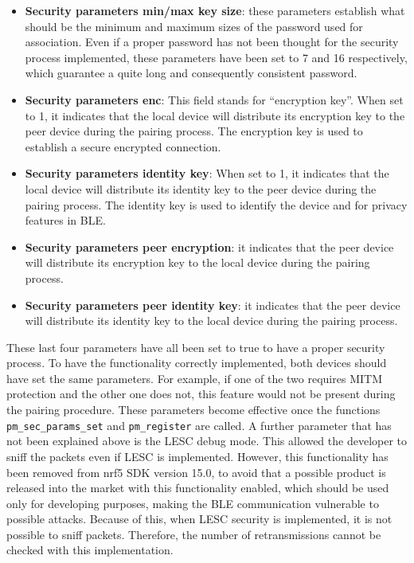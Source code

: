 \documentclass{Configuration_Files/PoliMi3i_thesis}
\begin{document}
\begin{itemize}
    \item \textbf{Security parameters min/max key size}: these parameters establish what should be the minimum and maximum sizes of the password used for association. Even if a proper password has not been thought for the security process implemented, these parameters have been set to 7 and 16 respectively, which guarantee a quite long and consequently consistent password.
    \item \textbf{Security parameters enc}: This field stands for ``encryption key''. When set to 1, it indicates that the local device will distribute its encryption key to the peer device during the pairing process. The encryption key is used to establish a secure encrypted connection.
    \item \textbf{Security parameters identity key}: When set to 1, it indicates that the local device will distribute its identity key to the peer device during the pairing process. The identity key is used to identify the device and for privacy features in BLE.
    \item \textbf{Security parameters peer encryption}: it indicates that the peer device will distribute its encryption key to the local device during the pairing process.
    \item \textbf{Security parameters peer identity key}: it indicates that the peer device will distribute its identity key to the local device during the pairing process.
\end{itemize}

These last four parameters have all been set to true to have a proper security process. To have the functionality correctly implemented, both devices should have set the same parameters. For example, if one of the two requires MITM protection and the other one does not, this feature would not be present during the pairing procedure. These parameters become effective once the functions \texttt{pm\_sec\_params\_set} and \texttt{pm\_register} are called. A further parameter that has not been explained above is the LESC debug mode. This allowed the developer to sniff the packets even if LESC is implemented. However, this functionality has been removed from nrf5 SDK version 15.0, to avoid that a possible product is released into the market with this functionality enabled, which should be used only for developing purposes, making the BLE communication vulnerable to possible attacks. Because of this, when LESC security is implemented, it is not possible to sniff packets. Therefore, the number of retransmissions cannot be checked with this implementation.
\end{document}
